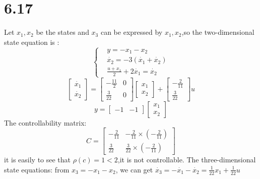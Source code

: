 \documentclass{article}
\begin{document}
\section*{6.17}
Let $x_1,x_2$ be the states and $x_3$ can be expressed by $x_1,x_2$,so the two-dimensional state equation is :
\[
\left\{
\begin{aligned}
    &y=-x_1-x_2\\
    &\dot{x_2}=-3(\dot{x_1}+\dot{x_2})\\
    &\frac{u+x_1}{2}+2\dot{x_1}=\dot{x_2}
\end{aligned}    
\right.    
\]
\[
    \left[
        \begin{array}{c}
            \dot{x_1}\\
            \dot{x_2}
        \end{array}
    \right]=
    \left[
        \begin{array}{cc}
            -\frac{11}{2} & 0\\
            \frac{3}{22} & 0
        \end{array}
    \right]
    \left[
        \begin{array}{c}
            x_1\\
            x_2
        \end{array}
    \right]+
    \left[
        \begin{array}{c}
            -\frac{2}{11}\\
            \frac{3}{22}
        \end{array}
    \right]u    
\]
\[
y=\left[
    \begin{array}{cc}
        -1 & -1
    \end{array}
\right]
\left[
    \begin{array}{c}
        x_1\\
        x_2
    \end{array}
\right]    
\]
The controllability matrix:
\[
C=\left[
    \begin{array}{ccc}
        -\frac{2}{11} & -\frac{2}{11}\times (-\frac{2}{11})\\
        \frac{3}{22} & \frac{3}{22} \times (-\frac{2}{11})
    \end{array}
\right]    
\]
it is easily to see that $\rho(c)=1<2$,it is not controllable.
The three-dimensional state equations:
from $x_3=-x_1-x_2$, we can get $\dot{x_3}=-\dot{x_1}-\dot{x_2}=\frac{1}{22}x_1+\frac{1}{22}u$
\end{document}
